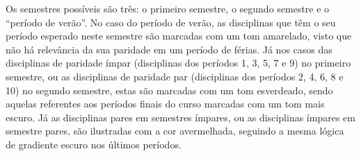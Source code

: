 Os semestres possíveis são três: o primeiro semestre, o segundo semestre e o ``período de verão''. No caso do período de verão, as disciplinas que têm o seu período esperado neste semestre são marcadas com um tom amarelado, visto que não há relevância da sua paridade em um período de férias. Já nos casos das disciplinas de paridade ímpar (disciplinas dos períodos 1, 3, 5, 7 e 9) no primeiro semestre, ou as disciplinas de paridade par (disciplinas dos períodos 2, 4, 6, 8 e 10) no segundo semestre, estas são marcadas com um tom esverdeado, sendo aquelas referentes aos períodos finais do curso marcadas com um tom mais escuro. Já as disciplinas pares em semestres ímpares, ou as disciplinas ímpares em semestre pares, são ilustradas com a cor avermelhada, seguindo a mesma lógica de gradiente escuro nos últimos períodos.
